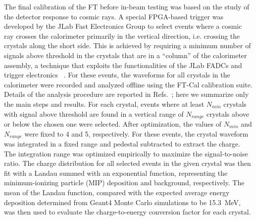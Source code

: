 The final calibration of the FT before in-beam testing was based on the study of the detector response to cosmic
rays. A special FPGA-based trigger was developed by the JLab Fast Electronics Group to select events where a
cosmic ray crosses the calorimeter primarily in the vertical direction, i.e. crossing the crystals along the short side.
This is achieved by requiring a minimum number of signals above threshold in the crystals that are in a ``column'' of
the calorimeter assembly, a technique that exploits the functionalities of the JLab FADCs and trigger electronics
~\cite{daq,trigger}. For these events, the waveforms for all crystals in the calorimeter were recorded and analyzed
offline using the FT-Cal calibration suite. Details of the analysis procedure are reported in
Refs.~\cite{cosmics1,cosmics2}; here we summarize only the main steps and results. For each crystal, events where
at least $N_{min}$ crystals with signal above threshold are found in a vertical range of $N_{range}$ crystals above or
below the chosen one were selected. After optimization, the values of $N_{min}$ and $N_{range}$ were fixed to 4 and
5, respectively. For these events, the crystal waveform was integrated in a fixed range and pedestal subtracted to
extract the charge. The integration range was optimized empirically to maximize the signal-to-noise ratio. The
charge distribution for all selected events in the given crystal was then fit with a Landau summed with an exponential
function, representing the minimum-ionizing particle (MIP) deposition and background, respectively. The mean of the
Landau function, compared with the expected average energy deposition determined from Geant4 Monte Carlo
simulations to be 15.3~MeV, was then used to evaluate the charge-to-energy conversion factor for each crystal. 

